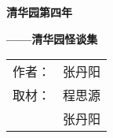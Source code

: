 \documentclass[UTF-8]{ctexbook}
\begin{document}

\begin{titlepage}
	\centering
	\linespread{1.2}
	\vspace*{1cm}
	{ \textbf{清华园第四年}\par}
	\vspace{0.5cm}
	{ \textbf{——清华园怪谈集}\par}
	\vfill
	\begin{table}[!hb]
		\LARGE
		\centering
		\begin{tabular}{rc}
			作者： &	张丹阳 \\
			取材： &	程思源 \\
			&			张丹阳
		\end{tabular}
		\vspace{1cm}
	\end{table}
\end{titlepage}

\pagestyle{headings}


\tableofcontents



\end{document}
